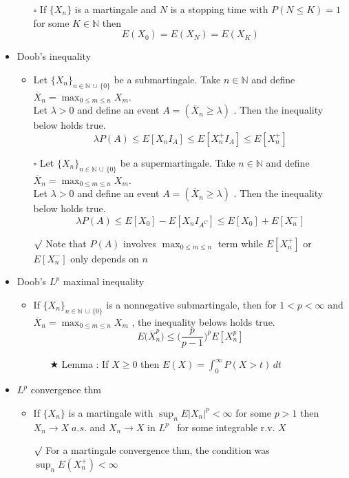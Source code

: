 \documentclass[12pt, A4]{article}
\newcommand{\sq}{$\square$}
\newcommand{\rmk}{$\surd$}
\newcommand{\trick}{$\bigstar$}
\newcommand{\N}{\mathbb{N}}
\newcommand{\union}{\,\cup\,}
\begin{document}
\begin{itemize}
\begin{itemize}
		\item[\sq] If $\{X_n\}$ is a martingale and $N$ is a stopping time with $P(N\leq K)=1$ for some $K\in \N$ then $$E(X_0)= E(X_N)= E(X_K) $$
	\end{itemize}
	\item Doob's inequality
	\begin{itemize}
		\item Let $\{X_n\}_{n\in \N\union \{0\} }$ be a submartingale. Take $n\in \N$ and define $\overline{X}_n=\max_{0\leq m \leq n}X_m$. \\ Let $\lambda>0$ and define an event $A=(\overline{X}_n\geq \lambda)$ . Then the inequality below holds true.
		$$
			\lambda P(A)\leq E[X_nI_A]\leq E[X_n^+ I_A]\leq E[X_n^+]
		$$
		\item[\sq] Let $\{X_n\}_{n\in \N\union \{0\} }$ be a supermartingale. Take $n\in \N$ and define $\overline{X}_n=\max_{0\leq m \leq n}X_m$. \\ Let $\lambda>0$ and define an event $A=(\overline{X}_n\geq \lambda)$ . Then the inequality below holds true.
		$$
			\lambda P(A)\leq E[X_0]-E[X_n I_{A^C}]\leq E[X_0]+E[X_n^-]
		$$ 
		\item[\rmk] Note that $P(A)$ involves $\max_{0\leq m \leq n}$ term while $E[X_n^+]$ or $E[X_n^-]$ only depends on $n$
	\end{itemize}
	\item Doob's $L^p$ maximal inequality
	\begin{itemize}
		\item If $\{X_n\}_{n\in \N\union \{0\} }$ is a nonnegative submartingale, then for $1<p<\infty$ and \\ $\overline{X}_n=\max_{0\leq m \leq n}X_m$ , the inequality belows holds true. 
		$$
			E\big(\overline{X}_n^p\big)\leq \Big(\frac{p}{p-1}\Big)^p E[X_n^p]
		$$
		\begin{itemize}
			\item[\trick] Lemma : If $X\geq 0$ then $E(X)=\int_0^\infty P(X>t)\, dt$
		\end{itemize}
	\end{itemize}
	\item $L^p$ convergence thm
	\begin{itemize}
		\item If $\{X_n\}$ is a martingale with $\sup_n E|X_n|^p<\infty$ for some $p>1$ then $X_n\rightarrow X\; a.s.$ and $X_n\rightarrow X$ in $L^p$ \, for some integrable r.v. $X$
		\item[\rmk] For a martingale convergence thm, the condition was $\sup_n E(X_n^+)<\infty$

\end{itemize}
\end{itemize}
\end{document}
